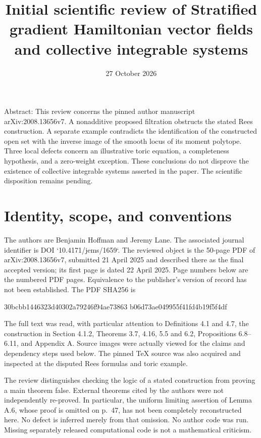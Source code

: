 \documentclass[10pt]{article}
\title{Initial scientific review of
Stratified gradient Hamiltonian vector fields
and collective integrable systems}
\author{}
\date{27 October 2026}
\begin{document}
\maketitle
Abstract: This review concerns the pinned author manuscript arXiv:2008.13656v7. A nonadditive proposed filtration obstructs the stated Rees construction. A separate example contradicts the identification of the constructed open set with the inverse image of the smooth locus of its moment polytope. Three local defects concern an illustrative toric equation, a completeness hypothesis, and a zero-weight exception. These conclusions do not disprove the existence of collective integrable systems asserted in the paper. The scientific disposition remains pending.\par
\section*{Identity, scope, and conventions}
The authors are Benjamin Hoffman and Jeremy Lane. The associated journal identifier is DOI `10.4171/jems/1659`. The reviewed object is the 50-page PDF of arXiv:2008.13656v7, submitted 21 April 2025 and described there as the final accepted version; its first page is dated 22 April 2025. Page numbers below are the numbered PDF pages. Equivalence to the publisher’s version of record has not been established. The PDF SHA256 is\par
30bcbb1446323d40302a79246f94ae73863
b06d73ae049955f41fd4b19f5f4df\par
The full text was read, with particular attention to Definitions 4.1 and 4.7, the construction in Section 4.1.2, Theorems 3.7, 4.16, 5.5 and 6.2, Propositions 6.8–6.11, and Appendix A. Source images were actually viewed for the claims and dependency steps used below. The pinned TeX source was also acquired and inspected at the disputed Rees formulas and toric example.\par
The review distinguishes checking the logic of a stated construction from proving a main theorem false. External theorems cited by the authors were not independently re-proved. In particular, the uniform limiting assertion of Lemma A.6, whose proof is omitted on p. 47, has not been completely reconstructed here. No defect is inferred merely from that omission. No author code was run. Missing separately released computational code is not a mathematical criticism.\par
\end{document}
